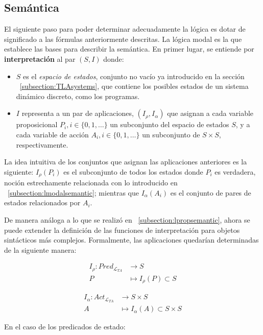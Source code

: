 \subsection{Semántica}\label{subsection:TLAsemantics}
El siguiente paso para poder determinar adecuadamente la lógica es dotar de significado a las fórmulas anteriormente descritas. La lógica modal es la que establece las bases para describir la semántica. En primer lugar, se entiende por \textbf{interpretación} al par $(S,I)$ donde:
\begin{itemize}
    \item $S$ es el \textit{espacio de estados}, conjunto no vacío ya introducido en la sección ~\ref{subsection:TLAsystems}, que contiene los posibles estados de un sistema dinámico discreto, como los programas.
    \item $I$ representa a un par de aplicaciones, $(I_\rho,I_\alpha)$ que asignan a cada variable proposicional $P_i, i \in \lbrace 0,1, \ldots \rbrace$ un subconjunto del espacio de estados $S$, y a cada variable de acción $A_i, i \in \lbrace 0,1, \ldots \rbrace$ un subconjunto de $S \times S$, respectivamente.
\end{itemize}

La idea intuitiva de los conjuntos que asignan las aplicaciones anteriores es la siguiente: $I_\rho(P_i)$ es el subconjunto de todos los estados donde $P_i$ es verdadera, noción estrechamente relacionada con lo introducido en ~\ref{subsection:lmodalsemantic}; mientras que  $I_\alpha(A_i)$ es el conjunto de pares de estados relacionados por $A_i$.

De manera análoga a lo que se realizó en ~\ref{subsection:lpropsemantic}, ahora se puede extender la definición de las funciones de interpretación para objetos sintácticos más complejos. Formalmente, las aplicaciones quedarían determinadas de la siguiente manera:

\begin{align*}
    I_\rho: Pred_{\mathcal{L}_{TA}} &\to S \\
    P &\mapsto I_\rho(P) \subset S
\end{align*}

\begin{align*}
    I_\alpha: Act_{\mathcal{L}_{TA}} &\to S \times S\\
    A &\mapsto I_\alpha(A) \subset S \times S
\end{align*}

\noindent
En el caso de los predicados de estado:

